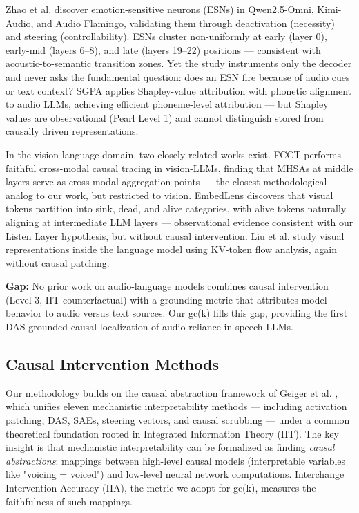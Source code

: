 \documentclass[a4paper]{article}
\begin{document}
Zhao et al. \cite{arxiv_2601.03115} discover emotion-sensitive neurons (ESNs) in Qwen2.5-Omni, Kimi-Audio, and Audio Flamingo, validating them through deactivation (necessity) and steering (controllability). ESNs cluster non-uniformly at early (layer 0), early-mid (layers 6–8), and late (layers 19–22) positions — consistent with acoustic-to-semantic transition zones. Yet the study instruments only the decoder and never asks the fundamental question: does an ESN fire because of audio cues or text context? SGPA \cite{arxiv_2603.02250} applies Shapley-value attribution with phonetic alignment to audio LLMs, achieving efficient phoneme-level attribution — but Shapley values are observational (Pearl Level 1) and cannot distinguish stored from causally driven representations.

In the vision-language domain, two closely related works exist. FCCT \cite{li2025} performs faithful cross-modal causal tracing in vision-LLMs, finding that MHSAs at middle layers serve as cross-modal aggregation points — the closest methodological analog to our work, but restricted to vision. EmbedLens \cite{fan2026} discovers that visual tokens partition into sink, dead, and alive categories, with alive tokens naturally aligning at intermediate LLM layers — observational evidence consistent with our Listen Layer hypothesis, but without causal intervention. Liu et al. \cite{ref2025} study visual representations inside the language model using KV-token flow analysis, again without causal patching.

\textbf{Gap:} No prior work on audio-language models combines causal intervention (Level 3, IIT counterfactual) with a grounding metric that attributes model behavior to audio versus text sources. Our gc(k) fills this gap, providing the first DAS-grounded causal localization of audio reliance in speech LLMs.

\subsection{Causal Intervention Methods}

Our methodology builds on the causal abstraction framework of Geiger et al. \cite{arxiv_2301.04709}, which unifies eleven mechanistic interpretability methods — including activation patching, DAS, SAEs, steering vectors, and causal scrubbing — under a common theoretical foundation rooted in Integrated Information Theory (IIT). The key insight is that mechanistic interpretability can be formalized as finding \textit{causal abstractions}: mappings between high-level causal models (interpretable variables like "voicing = voiced") and low-level neural network computations. Interchange Intervention Accuracy (IIA), the metric we adopt for gc(k), measures the faithfulness of such mappings.
\end{document}
